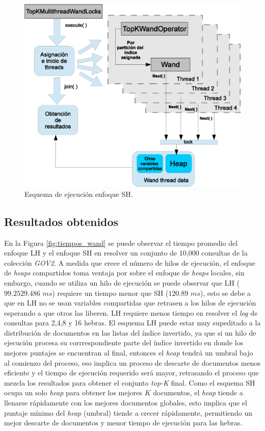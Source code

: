 \begin{figure}[tp]
\centering
\includegraphics[scale=.75]{images/ejecucion_topkmultithreadwandopCOMPARTIDO.eps}
\caption{Esquema de ejecución enfoque SH.}
\label{fig:esquema_ejecucion_wandsh}
\end{figure}


\subsection{Resultados obtenidos}
\label{evaluacionexperimental:resultadosObtenidos}
En la Figura \ref{fig:tiempos_wand} se puede observar el tiempo promedio del enfoque LH y el enfoque SH en resolver un conjunto de 10,000 consultas de la colección \textit{GOV2}. A medida que crece el número de hilos de ejecución, el enfoque de \textit{heaps} compartidos toma ventaja por sobre el enfoque de \textit{heaps} locales, sin embargo, cuando se utiliza un hilo de ejecución se puede observar que LH ($99.2529.486$ $ms$) requiere un tiempo menor que SH ($120.89$ $ms$), esto se debe a que en LH no se usan variables compartidas que retrasen a los hilos de ejecución esperando a que otros las liberen. LH requiere menos tiempo en resolver el \textit{log} de consultas para 2,4,8 y 16 hebras. 
El esquema LH puede estar muy supeditado a la distribución de documentos en las listas del índice invertido, ya que si un hilo de ejecución procesa su corrrespondiente parte del índice invertido en donde los mejores puntajes se encuentran al final, entonces el \textit{heap} tendrá un umbral bajo al comienzo del proceso, eso implica un proceso de descarte de documentos menos eficiente y el tiempo de ejecución requerido será mayor, retrasando el proceso que mezcla los resultados para obtener el conjunto \textit{top-K} final. 
Como el esquema SH ocupa un solo \textit{heap} para obtener los mejores $K$ documentos, el \textit{heap} tiende a llenarse rápidamente con los mejores documentos globales, esto implica que el puntaje mínimo del \textit{heap} (umbral) tiende a crecer rápidamente, permitiendo un mejor descarte de documentos y menor tiempo de ejecución para las hebras. 

